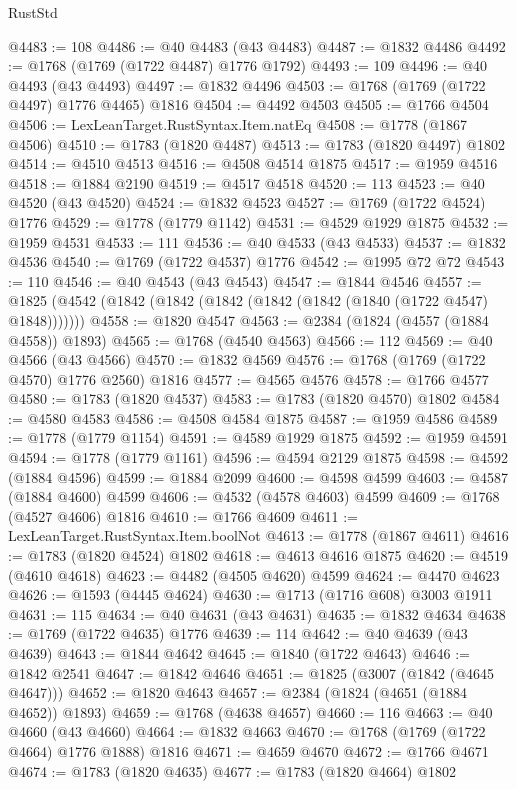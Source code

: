 \begin{lexlean}{RustStd}
\begin{coremodule}
{\begin{coremodule}
{{{{{{{{{{{{{{{{{{{{{{{{{{{{{{{{{{{{{{{{{{{{{{{@4483 := 108
@4486 := @40 @4483 (@43 @4483)
@4487 := @1832 @4486
@4492 := @1768 (@1769 (@1722 @4487) @1776 @1792)
@4493 := 109
@4496 := @40 @4493 (@43 @4493)
@4497 := @1832 @4496
@4503 := @1768 (@1769 (@1722 @4497) @1776 @4465) @1816
@4504 := @4492 @4503
@4505 := @1766 @4504
@4506 := LexLeanTarget.RustSyntax.Item.natEq
@4508 := @1778 (@1867 @4506)
@4510 := @1783 (@1820 @4487)
@4513 := @1783 (@1820 @4497) @1802
@4514 := @4510 @4513
@4516 := @4508 @4514 @1875
@4517 := @1959 @4516
@4518 := @1884 @2190
@4519 := @4517 @4518
@4520 := 113
@4523 := @40 @4520 (@43 @4520)
@4524 := @1832 @4523
@4527 := @1769 (@1722 @4524) @1776
@4529 := @1778 (@1779 @1142)
@4531 := @4529 @1929 @1875
@4532 := @1959 @4531
@4533 := 111
@4536 := @40 @4533 (@43 @4533)
@4537 := @1832 @4536
@4540 := @1769 (@1722 @4537) @1776
@4542 := @1995 @72 @72
@4543 := 110
@4546 := @40 @4543 (@43 @4543)
@4547 := @1844 @4546
@4557 := @1825 (@4542 (@1842 (@1842 (@1842 (@1842 (@1842 (@1840 (@1722 @4547) @1848)))))))
@4558 := @1820 @4547
@4563 := @2384 (@1824 (@4557 (@1884 @4558)) @1893)
@4565 := @1768 (@4540 @4563)
@4566 := 112
@4569 := @40 @4566 (@43 @4566)
@4570 := @1832 @4569
@4576 := @1768 (@1769 (@1722 @4570) @1776 @2560) @1816
@4577 := @4565 @4576
@4578 := @1766 @4577
@4580 := @1783 (@1820 @4537)
@4583 := @1783 (@1820 @4570) @1802
@4584 := @4580 @4583
@4586 := @4508 @4584 @1875
@4587 := @1959 @4586
@4589 := @1778 (@1779 @1154)
@4591 := @4589 @1929 @1875
@4592 := @1959 @4591
@4594 := @1778 (@1779 @1161)
@4596 := @4594 @2129 @1875
@4598 := @4592 (@1884 @4596)
@4599 := @1884 @2099
@4600 := @4598 @4599
@4603 := @4587 (@1884 @4600) @4599
@4606 := @4532 (@4578 @4603) @4599
@4609 := @1768 (@4527 @4606) @1816
@4610 := @1766 @4609
@4611 := LexLeanTarget.RustSyntax.Item.boolNot
@4613 := @1778 (@1867 @4611)
@4616 := @1783 (@1820 @4524) @1802
@4618 := @4613 @4616 @1875
@4620 := @4519 (@4610 @4618)
@4623 := @4482 (@4505 @4620) @4599
@4624 := @4470 @4623
@4626 := @1593 (@4445 @4624)
@4630 := @1713 (@1716 @608) @3003 @1911
@4631 := 115
@4634 := @40 @4631 (@43 @4631)
@4635 := @1832 @4634
@4638 := @1769 (@1722 @4635) @1776
@4639 := 114
@4642 := @40 @4639 (@43 @4639)
@4643 := @1844 @4642
@4645 := @1840 (@1722 @4643)
@4646 := @1842 @2541
@4647 := @1842 @4646
@4651 := @1825 (@3007 (@1842 (@4645 @4647)))
@4652 := @1820 @4643
@4657 := @2384 (@1824 (@4651 (@1884 @4652)) @1893)
@4659 := @1768 (@4638 @4657)
@4660 := 116
@4663 := @40 @4660 (@43 @4660)
@4664 := @1832 @4663
@4670 := @1768 (@1769 (@1722 @4664) @1776 @1888) @1816
@4671 := @4659 @4670
@4672 := @1766 @4671
@4674 := @1783 (@1820 @4635)
@4677 := @1783 (@1820 @4664) @1802
}}}}}}}}}}}}}}}}}}}}}}}}}}}}}}}}}}}}}}}}}}}}}}}
\end{coremodule}}
\end{coremodule}
\end{lexlean}
